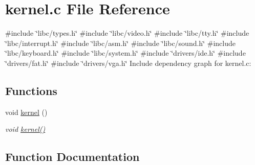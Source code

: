 \hypertarget{a00011}{}\section{kernel.\+c File Reference}
\label{a00011}
{\ttfamily \#include \char`\"{}libc/types.\+h\char`\"{}}\newline
{\ttfamily \#include \char`\"{}libc/video.\+h\char`\"{}}\newline
{\ttfamily \#include \char`\"{}libc/tty.\+h\char`\"{}}\newline
{\ttfamily \#include \char`\"{}libc/interrupt.\+h\char`\"{}}\newline
{\ttfamily \#include \char`\"{}libc/asm.\+h\char`\"{}}\newline
{\ttfamily \#include \char`\"{}libc/sound.\+h\char`\"{}}\newline
{\ttfamily \#include \char`\"{}libc/keyboard.\+h\char`\"{}}\newline
{\ttfamily \#include \char`\"{}libc/system.\+h\char`\"{}}\newline
{\ttfamily \#include \char`\"{}drivers/ide.\+h\char`\"{}}\newline
{\ttfamily \#include \char`\"{}drivers/fat.\+h\char`\"{}}\newline
{\ttfamily \#include \char`\"{}drivers/vga.\+h\char`\"{}}\newline
Include dependency graph for kernel.\+c\+:
\subsection*{Functions}
\begin{DoxyCompactItemize}
\item 
void \hyperlink{a00011_aadb4d5397feda84ee5ee39b33082faca_aadb4d5397feda84ee5ee39b33082faca}{kernel} ()
\begin{DoxyCompactList}\small\item\em void \hyperlink{a00011_aadb4d5397feda84ee5ee39b33082faca_aadb4d5397feda84ee5ee39b33082faca}{kernel()} \end{DoxyCompactList}\end{DoxyCompactItemize}


\subsection{Function Documentation}
\mbox{\label{a00011_aadb4d5397feda84ee5ee39b33082faca_aadb4d5397feda84ee5ee39b33082faca}} 
